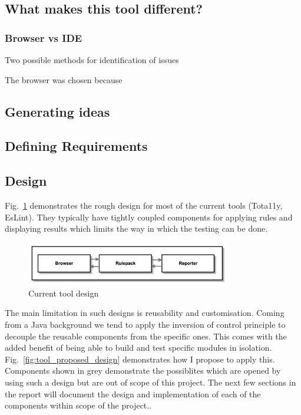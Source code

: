 \subsection{What makes this tool different?}


\subsubsection{Browser vs IDE}
Two possible methods for identification of issues

The browser was chosen because


\subsection{Generating ideas}

\subsection{Defining Requirements}

\subsection{Design}
Fig.~\ref{fig:tool_current_design} demonstrates the rough design for most of
the current tools (Tota11y, EsLint). They typically have tightly coupled
components for applying rules and displaying results which limits the way in
which the testing can be done.

\begin{figure}[H]
\centering
\includegraphics[width=0.8\textwidth]{figures/a11y_tool_current_design}
\captionsetup{justification=centering}
\caption{Current tool design
\label{fig:tool_current_design}}
\end{figure}

The main limitation in such designs is reusability and customisation. Coming
from a Java background we tend to apply the inversion of control principle to
decouple the reusable components from the specific ones. This comes with the
added benefit of being able to build and test specific modules in isolation.
Fig.~\ref{fig:tool_proposed_design} demonstrates how I propose to apply
this. Components shown in grey demonstrate the possiblites which are opened
by using such a design but are out of scope of this project. The next few
sections in the report will document the design and implementation of each of
the components within scope of the project..

